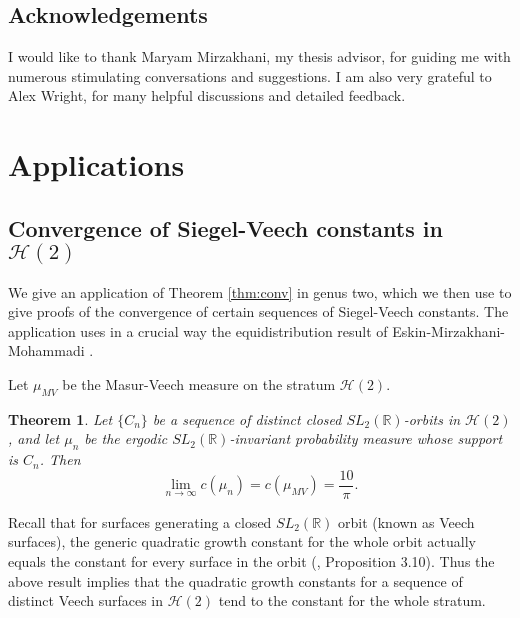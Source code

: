 \documentclass{article}
\newtheorem{thm}{Theorem}[section]
\theoremstyle{definition}
\begin{document}
\subsection{Acknowledgements}
I would like to thank Maryam Mirzakhani, my thesis advisor, for guiding me with numerous stimulating conversations and suggestions.  I am also very grateful to Alex Wright, for many helpful discussions and detailed feedback.  


\section{Applications}
\label{sec:applications}

\subsection{Convergence of Siegel-Veech constants in $\mathcal{H}(2)$}

We give an application of Theorem \ref{thm:conv} in genus two, which we then use to give proofs of the convergence of certain sequences of Siegel-Veech constants.  The application uses in a crucial way the equidistribution result of Eskin-Mirzakhani-Mohammadi \cite{emm2015}.

Let $\mu_{MV}$ be the Masur-Veech measure on the stratum $\mathcal{H}(2)$.

\begin{thm} 
Let $\{C_n\}$ be a sequence of distinct closed $SL_2(\mathbb{R})$-orbits in $\mathcal{H}(2)$, and let $\mu_n$ be the ergodic $SL_2(\mathbb{R})$-invariant probability measure whose support is $C_n$.  Then
 $$\lim_{n\to\infty} c(\mu_n) =c(\mu_{MV})=\frac{10}{\pi}.$$
\label{thm:h2}
\end{thm}

Recall that for surfaces generating a closed $SL_2(\mathbb{R})$ orbit (known as Veech surfaces), the generic quadratic growth constant for the whole orbit actually equals the constant for every surface in the orbit (\cite{veech1989}, Proposition 3.10).  Thus the above result implies that the quadratic growth constants for a sequence of distinct Veech surfaces in $\mathcal{H}(2)$ tend to the constant for the whole stratum.  
\end{document}
